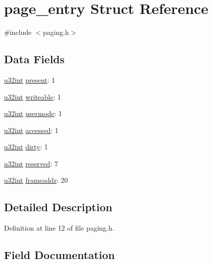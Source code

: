 \hypertarget{structpage__entry}{}\section{page\+\_\+entry Struct Reference}
\label{structpage__entry}


{\ttfamily \#include $<$paging.\+h$>$}

\subsection*{Data Fields}
\begin{DoxyCompactItemize}
\item 
\hyperlink{system_8h_a757de76cafbcddaac0d1632902fe4cb8}{u32int} \hyperlink{structpage__entry_a34148a94af9bfabbb8c4f00f9865dfee}{present}\+: 1
\item 
\hyperlink{system_8h_a757de76cafbcddaac0d1632902fe4cb8}{u32int} \hyperlink{structpage__entry_a2ea8d7684fe45772b6acba70d46e41d9}{writeable}\+: 1
\item 
\hyperlink{system_8h_a757de76cafbcddaac0d1632902fe4cb8}{u32int} \hyperlink{structpage__entry_a2beafd3900a1f36f09af9c35a9a14f18}{usermode}\+: 1
\item 
\hyperlink{system_8h_a757de76cafbcddaac0d1632902fe4cb8}{u32int} \hyperlink{structpage__entry_a8b4097e0cee08d028182b11bd1f73f92}{accessed}\+: 1
\item 
\hyperlink{system_8h_a757de76cafbcddaac0d1632902fe4cb8}{u32int} \hyperlink{structpage__entry_ab3b5e22c6146f227a26bdec64e63f4b0}{dirty}\+: 1
\item 
\hyperlink{system_8h_a757de76cafbcddaac0d1632902fe4cb8}{u32int} \hyperlink{structpage__entry_af6d963f09b01571b107e6f505050c0e5}{reserved}\+: 7
\item 
\hyperlink{system_8h_a757de76cafbcddaac0d1632902fe4cb8}{u32int} \hyperlink{structpage__entry_a68a6dc54a7ab6f7fb1a068476190bf67}{frameaddr}\+: 20
\end{DoxyCompactItemize}


\subsection{Detailed Description}


Definition at line 12 of file paging.\+h.



\subsection{Field Documentation}
